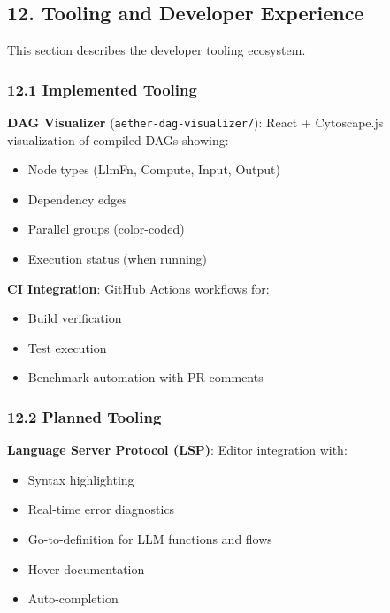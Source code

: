 \documentclass[
]{article}
\newcommand{\passthrough}[1]{#1}
\providecommand{\tightlist}{%
  \setlength{\itemsep}{0pt}\setlength{\parskip}{0pt}}
\begin{document}
\subsection{12. Tooling and Developer
Experience}\label{tooling-and-developer-experience}

This section describes the developer tooling ecosystem.

\subsubsection{12.1 Implemented Tooling}\label{implemented-tooling}

\textbf{DAG Visualizer}
(\passthrough{\lstinline!aether-dag-visualizer/!}): React + Cytoscape.js
visualization of compiled DAGs showing:

\begin{itemize}
\tightlist
\item
  Node types (LlmFn, Compute, Input, Output)
\item
  Dependency edges
\item
  Parallel groups (color-coded)
\item
  Execution status (when running)
\end{itemize}

\textbf{CI Integration}: GitHub Actions workflows for:

\begin{itemize}
\tightlist
\item
  Build verification
\item
  Test execution
\item
  Benchmark automation with PR comments
\end{itemize}

\subsubsection{12.2 Planned Tooling}\label{planned-tooling}

\textbf{Language Server Protocol (LSP)}: Editor integration with:

\begin{itemize}
\tightlist
\item
  Syntax highlighting
\item
  Real-time error diagnostics
\item
  Go-to-definition for LLM functions and flows
\item
  Hover documentation
\item
  Auto-completion
\end{itemize}
\end{document}
